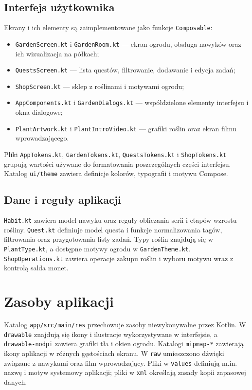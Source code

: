 \documentclass[a4paper,12pt]{article}
\begin{document}
\subsection{Interfejs użytkownika}
Ekrany i ich elementy są zaimplementowane jako funkcje \texttt{Composable}:
\begin{itemize}[leftmargin=1.2cm]
  \item \texttt{GardenScreen.kt} i \texttt{GardenRoom.kt} --- ekran ogrodu, obsługa nawyków oraz ich wizualizacja na półkach;
  \item \texttt{QuestsScreen.kt} --- lista questów, filtrowanie, dodawanie i edycja zadań;
  \item \texttt{ShopScreen.kt} --- sklep z roślinami i motywami ogrodu;
  \item \texttt{AppComponents.kt} i \texttt{GardenDialogs.kt} --- współdzielone elementy interfejsu i okna dialogowe;
  \item \texttt{PlantArtwork.kt} i \texttt{PlantIntroVideo.kt} --- grafiki roślin oraz ekran filmu wprowadzającego.
\end{itemize}

Pliki \texttt{AppTokens.kt}, \texttt{GardenTokens.kt}, \texttt{QuestsTokens.kt} i \texttt{ShopTokens.kt} grupują wartości używane do formatowania poszczególnych części interfejsu. Katalog \texttt{ui/theme} zawiera definicje kolorów, typografii i motywu Compose.

\subsection{Dane i reguły aplikacji}
\texttt{Habit.kt} zawiera model nawyku oraz reguły obliczania serii i etapów wzrostu rośliny. \texttt{Quest.kt} definiuje model questa i funkcje normalizowania tagów, filtrowania oraz przygotowania listy zadań. Typy roślin znajdują się w \texttt{PlantType.kt}, a dostępne motywy ogrodu w \texttt{GardenTheme.kt}. \texttt{ShopOperations.kt} zawiera operacje zakupu roślin i wyboru motywu wraz z kontrolą salda monet.

\section{Zasoby aplikacji}
Katalog \texttt{app/src/main/res} przechowuje zasoby niewykonywalne przez Kotlin. W \texttt{drawable} znajdują się ikony i ilustracje wykorzystywane w interfejsie, a \texttt{drawable-nodpi} zawiera grafiki tła i okien ogrodu. Katalogi \texttt{mipmap-*} zawierają ikony aplikacji w różnych gęstościach ekranu. W \texttt{raw} umieszczono dźwięki związane z nawykami oraz film wprowadzający. Pliki w \texttt{values} definiują m.in. nazwę i motyw systemowy aplikacji; pliki w \texttt{xml} określają zasady kopii zapasowej danych.
\end{document}
